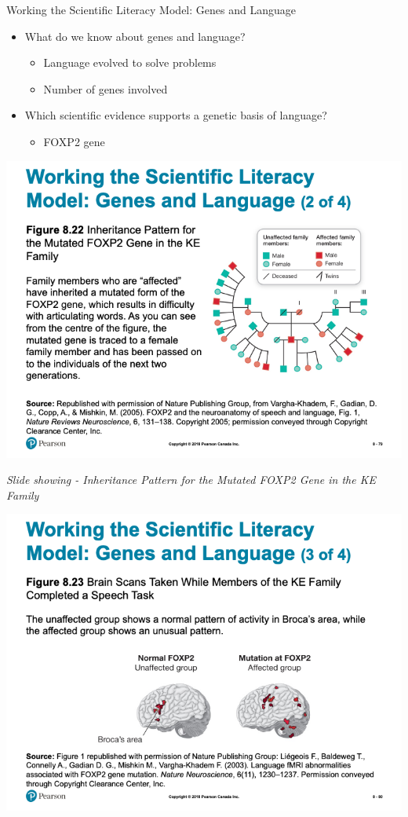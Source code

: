 \documentclass[
]{book}
\providecommand{\tightlist}{%
  \setlength{\itemsep}{0pt}\setlength{\parskip}{0pt}}
\begin{document}
Working the Scientific Literacy Model: Genes and Language

\begin{itemize}
\tightlist
\item
  What do we know about genes and language?

  \begin{itemize}
  \tightlist
  \item
    Language evolved to solve problems\\
  \item
    Number of genes involved
  \end{itemize}
\item
  Which scientific evidence supports a genetic basis of language?

  \begin{itemize}
  \tightlist
  \item
    FOXP2 gene
  \end{itemize}
\end{itemize}

\includegraphics{assets/unit_1/slide_79.png}

\emph{Slide showing - Inheritance Pattern for the Mutated FOXP2 Gene in the KE Family}

\includegraphics{assets/unit_1/slide_80.png}
\end{document}
